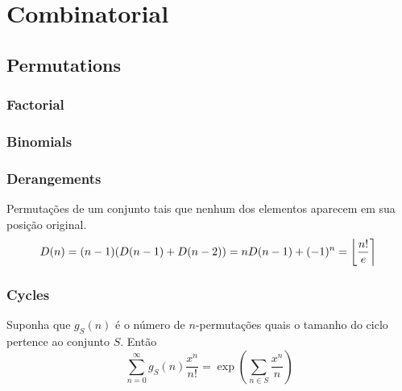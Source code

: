 \newcommand*{\Comb}[2]{{}^{#1}C_{#2}}%
\newcommand{\stirlingfirst}[2]{\genfrac{[}{]}{0pt}{}{#1}{#2}}
\newcommand{\stirlingsecond}[2]{\genfrac{\{}{\}}{0pt}{}{#1}{#2}}

\chapter{Combinatorial}

\section{Permutations}
	\subsection{Factorial}
		
\subsection{Binomials}

\subsection{Derangements}
		Permutações de um conjunto tais que nenhum dos elementos aparecem em sua posição original.
		\small
		\[ \mkern-2mu D(n) = (n-1)(D(n-1)+D(n-2)) = n D(n-1)+(-1)^n = \left\lfloor\frac{n!}{e}\right\rceil \]
		\normalsize

\subsection{Cycles}
		Suponha que $g_S(n)$ é o número de $n$-permutações quais o tamanho do ciclo pertence ao conjunto $S$. Então
		\small
		$$\sum_{n=0} ^\infty g_S(n) \frac{x^n}{n!} = \exp\left(\sum_{n\in S} \frac{x^n} {n} \right)$$
		\normalsize\columnbreak

	
